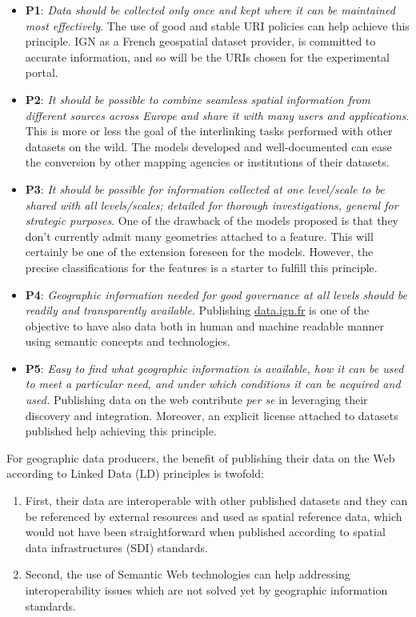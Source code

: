 \documentclass[a4paper,11pt,twoside]{report}
\begin{document}
 
\begin{itemize}
\item \textbf{P1}: \textit{Data should be collected only once and kept where it can be maintained most effectively}. The use of good and stable URI policies can help achieve this principle. IGN as a French geospatial dataset provider, is committed to accurate information, and so will be the URIs chosen for the experimental portal.
\item \textbf{P2}: \textit{It should be possible to combine seamless spatial information from different sources across Europe and share it with many users and applications}. This is more or less the goal of the interlinking tasks performed with other datasets on the wild. The models developed and well-documented can ease the conversion by other mapping agencies or institutions of their datasets.  
\item \textbf{P3}:  \textit{It should be possible for information collected at one level/scale to be shared with all levels/scales; detailed for thorough investigations, general for strategic purposes}. One of the drawback of the models proposed is that they don't currently admit many geometries attached to a feature. This will certainly be one of the extension foreseen for the models. However, the precise classifications for the features is a starter to fulfill this principle.
\item \textbf{P4}: \textit{Geographic information needed for good governance at all levels should be readily and transparently available}. Publishing \url{data.ign.fr} is one of the objective to have also data both in human and machine readable manner using semantic concepts and technologies.
\item \textbf{P5}: \textit{Easy to find what geographic information is available, how it can be used to meet a particular need, and under which conditions it can be acquired and used.} Publishing data on the web contribute \textit{per se} in leveraging their discovery and integration. Moreover, an explicit license attached to datasets published help achieving this principle.
\end{itemize}
For geographic data producers, the benefit of publishing their data on the Web according to Linked Data  (LD) principles is twofold:
\begin{enumerate}
\item First, their data are interoperable with other published datasets and they can be referenced by external resources and used as spatial reference data, which would not have been straightforward when published according to spatial data infrastructures (SDI) standards.
\item Second, the use of Semantic Web technologies can help addressing interoperability issues which are not solved yet by geographic information standards. 
\end{enumerate}
 
\end{document}
